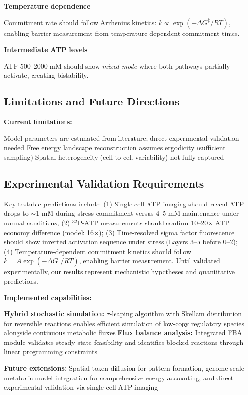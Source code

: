 \documentclass[twocolumn,11pt]{article}
\begin{document}
\textbf{Temperature dependence}

Commitment rate should follow Arrhenius kinetics: $k \propto \exp(-\Delta G^\ddagger / RT)$, enabling barrier measurement from temperature-dependent commitment times.

\textbf{Intermediate ATP levels}

ATP 500--2000 mM should show \textit{mixed mode} where both pathways partially activate, creating bistability.

\subsection{Limitations and Future Directions}

\textbf{Current limitations:}

Model parameters are estimated from literature; direct experimental validation needed
Free energy landscape reconstruction assumes ergodicity (sufficient sampling)
Spatial heterogeneity (cell-to-cell variability) not fully captured


\subsection{Experimental Validation Requirements}

Key testable predictions include: (1) Single-cell ATP imaging \citep{berg2009} should reveal ATP drops to $\sim$1 mM during stress commitment versus 4--5 mM maintenance under normal conditions; (2) $^{32}$P-ATP measurements should confirm 10--20× ATP economy difference (model: 16×); (3) Time-resolved sigma factor fluorescence should show inverted activation sequence under stress (Layers 3--5 before 0--2); (4) Temperature-dependent commitment kinetics should follow $k = A \exp(-\Delta G^\ddagger/RT)$, enabling barrier measurement. Until validated experimentally, our results represent mechanistic hypotheses and quantitative predictions.


\textbf{Implemented capabilities:}

\textbf{Hybrid stochastic simulation:} $\tau$-leaping algorithm with Skellam distribution for reversible reactions enables efficient simulation of low-copy regulatory species alongside continuous metabolic fluxes
\textbf{Flux balance analysis:} Integrated FBA module validates steady-state feasibility and identifies blocked reactions through linear programming constraints


\textbf{Future extensions:} Spatial token diffusion for pattern formation, genome-scale metabolic model integration for comprehensive energy accounting, and direct experimental validation via single-cell ATP imaging
\end{document}
